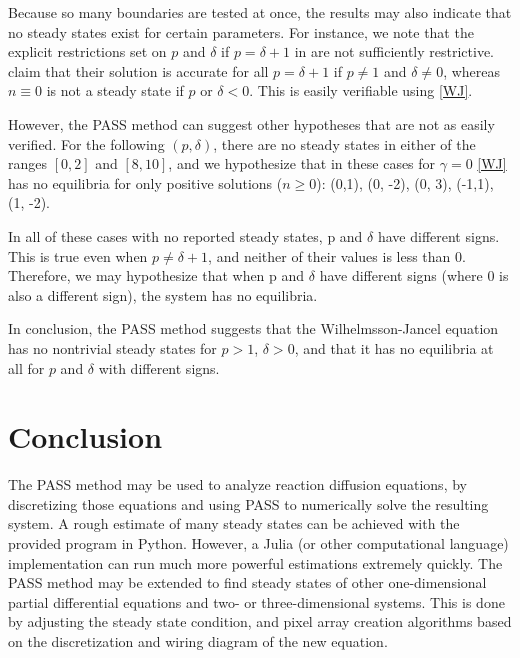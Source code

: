 \documentclass[11pt]{article}
\begin{document}
Because so many boundaries are tested at once, the results may also indicate that no steady states exist for certain parameters. For instance, we note that the explicit restrictions set on $p$ and $\delta$ if $p = \delta + 1$ in \citep{WJ} are not sufficiently restrictive. \citep{WJ} claim that their solution is accurate for all $p = \delta + 1$ if $p \ne 1$ and $\delta \ne 0$, whereas $n \equiv 0$ is not a steady state if $p$ or $\delta < 0$. This is easily verifiable using \cref{WJ}. 

However, the PASS method can suggest other hypotheses that are not as easily verified. For the following $(p, \delta)$, there are no steady states in either of the ranges $[0,2]$ and $[8,10]$, and we hypothesize that in these cases for $\gamma = 0$ \cref{WJ} has no equilibria for only positive solutions ($n \ge 0$): (0,1), (0, -2), (0, 3), (-1,1), (1, -2).

In all of these cases with no reported steady states, p and $\delta$ have different signs. This is true even when $p \ne \delta + 1$, and neither of their values is less than 0. Therefore, we may hypothesize that when p and $\delta$ have different signs (where 0 is also a different sign), the system has no equilibria. 

In conclusion, the PASS method suggests that the Wilhelmsson-Jancel equation has no nontrivial steady states for $p > 1$, $\delta > 0$, and that it has no equilibria at all for $p$ and $\delta$ with different signs.

\begin{comment}
\section{Analyzing the nonlocal Fisher equation}
Ask if this should be included for more variety, maybe legitimacy because relevant research is more recent? Thanks Stanford.
\end{comment}

\section{Conclusion}

The PASS method may be used to analyze reaction diffusion equations, by discretizing those equations and using PASS to numerically solve the resulting system. A rough estimate of many steady states can be achieved with the provided program in Python. However, a Julia (or other computational language) implementation can run much more powerful estimations extremely quickly. The PASS method may be extended to find steady states of other one-dimensional partial differential equations and two- or three-dimensional systems. This is done by adjusting the steady state condition, and pixel array creation algorithms based on the discretization and wiring diagram of the new equation.
\end{document}
